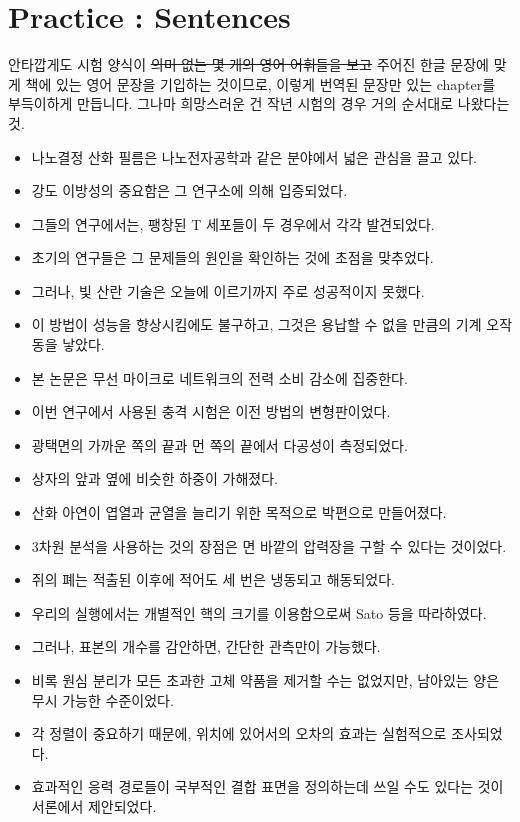 \documentclass[10pt]{report}
\begin{document}
	\chapter{Practice : Sentences}
	안타깝게도 시험 양식이 \sout{의미 없는 몇 개의 영어 어휘들을 보고} 주어진 한글 문장에 맞게 책에 있는 영어 문장을 기입하는 것이므로, 이렇게 번역된 문장만 있는 chapter를 부득이하게 만듭니다. 그나마 희망스러운 건 작년 시험의 경우 거의 순서대로 나왔다는 것.
	\begin{itemize}
		\item 나노결정 산화 필름은 나노전자공학과 같은 분야에서 넓은 관심을 끌고 있다.
		\item 강도 이방성의 중요함은 그 연구소에 의해 입증되었다.
		\item 그들의 연구에서는, 팽창된 T 세포들이 두 경우에서 각각 발견되었다.
		\item 초기의 연구들은 그 문제들의 원인을 확인하는 것에 초점을 맞추었다.
		\item 그러나, 빛 산란 기술은 오늘에 이르기까지 주로 성공적이지 못했다.
		\item 이 방법이 성능을 향상시킴에도 불구하고, 그것은 용납할 수 없을 만큼의 기계 오작동을 낳았다.
		\item 본 논문은 무선 마이크로 네트워크의 전력 소비 감소에 집중한다.
		\item 이번 연구에서 사용된 충격 시험은 이전 방법의 변형판이었다.
		\item 광택면의 가까운 쪽의 끝과 먼 쪽의 끝에서 다공성이 측정되었다.
		\item 상자의 앞과 옆에 비슷한 하중이 가해졌다.
		\item 산화 아연이 엽열과 균열을 늘리기 위한 목적으로 박편으로 만들어졌다.
		\item 3차원 분석을 사용하는 것의 장점은 면 바깥의 압력장을 구할 수 있다는 것이었다.
		\item 쥐의 폐는 적출된 이후에 적어도 세 번은 냉동되고 해동되었다.
		\item 우리의 실행에서는 개별적인 핵의 크기를 이용함으로써 Sato 등을 따라하였다.
		\item 그러나, 표본의 개수를 감안하면, 간단한 관측만이 가능했다.
		\item 비록 원심 분리가 모든 초과한 고체 약품을 제거할 수는 없었지만, 남아있는 양은 무시 가능한 수준이었다.
		\item 각 정렬이 중요하기 때문에, 위치에 있어서의 오차의 효과는 실험적으로 조사되었다.
		\item 효과적인 응력 경로들이 국부적인 결합 표면을 정의하는데 쓰일 수도 있다는 것이 서론에서 제안되었다.

\end{itemize}
\end{document}
